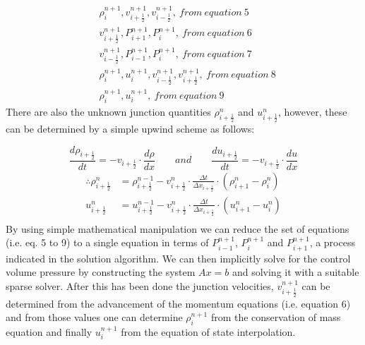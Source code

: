 \documentclass[11pt,letterpaper,titlepage]{article}
\newcommand{\half}{\frac{1}{2}}
\begin{document}
\begin{equation*}
\begin{aligned}
&\rho_i^{n+1}, v_{i+\half}^{n+1}, v_{i-\half}^{n+1}, \ from \ equation \ 5 \\
&v_{i+\half}^{n+1}, P_{i+1}^{n+1},P_{i}^{n+1}, \ from \ equation \ 6 \\
&v_{i-\half}^{n+1}, P_{i-1}^{n+1},P_{i}^{n+1}, \ from \ equation \ 7 \\
&\rho_i^{n+1}, u_{i}^{n+1}, v_{i-\half}^{n+1},v_{i+\half}^{n+1}, \ from \ equation \ 8 \\
&\rho_i^{n+1}, u_{i}^{n+1}, \ from \ equation \ 9
\end{aligned}
\end{equation*}
\newline
There are also the unknown junction quantities $\rho_{i+\half}^{n}$ and $u_{i+\half}^{n}$, however, these can be determined by a simple upwind scheme as follows:

\begin{equation*}
\frac{d \rho_{i+\half}}{dt}=-v_{i+\half} \cdot \frac{d\rho}{dx} \quad \quad and \quad \quad \frac{d u_{i+\half}}{dt}=-v_{i+\half} \cdot \frac{du}{dx} 
\end{equation*}
\begin{equation*}
\begin{aligned}
\therefore \rho_{i+\half}^n &= \rho_{i+\half}^{n-1} - v_{i+\half}^n \cdot \frac{\Delta t}{\Delta x_{i+\half}} \cdot (\rho_{i+1}^n-\rho_i^n) \\
           u_{i+\half}^n &= u_{i+\half}^{n-1} - v_{i+\half}^n \cdot \frac{\Delta t}{\Delta x_{i+\half}} \cdot (u_{i+1}^n-u_i^n) \\
\end{aligned}
\end{equation*}
\newline
By using simple mathematical manipulation we can reduce the set of equations (i.e. eq. 5 to 9) to a single equation in terms of $P_{i-1}^{n+1}$, $P_{i}^{n+1}$ and $P_{i+1}^{n+1}$, a process indicated in the solution algorithm. We can then implicitly solve for the control volume pressure by constructing the system $Ax=b$ and solving it with a suitable sparse solver. After this has been done the junction velocities, $v_{i+\half}^{n+1}$ can be determined from the advancement of the momentum equations (i.e. equation 6) and from those values one can determine $\rho_i^{n+1}$ from the conservation of mass equation and finally $u_i^{n+1}$ from the equation of state interpolation.
\end{document}
